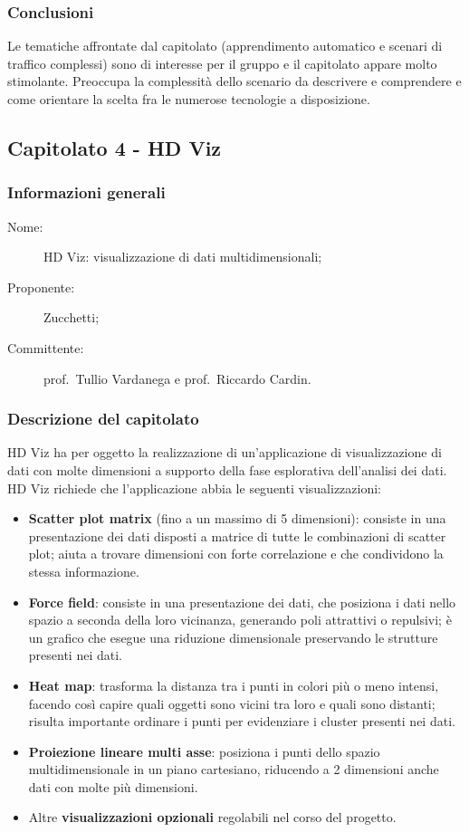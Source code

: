 \subsubsection{Conclusioni}
Le tematiche affrontate dal capitolato (apprendimento automatico e scenari di traffico complessi) sono di interesse per il gruppo e il capitolato appare molto stimolante. Preoccupa la complessità dello scenario da descrivere e comprendere e come orientare la scelta fra le numerose tecnologie a disposizione.

\subsection{Capitolato 4 - HD Viz}
\subsubsection{Informazioni generali}
\begin{description}
	\item[Nome:] HD Viz: visualizzazione di dati multidimensionali;
	\item[Proponente:] Zucchetti;
	\item[Committente:] prof.~Tullio Vardanega e prof.~Riccardo Cardin.
\end{description}
\subsubsection{Descrizione del capitolato}
HD Viz ha per oggetto la realizzazione di un'applicazione di visualizzazione di dati con molte dimensioni a supporto della fase esplorativa dell'analisi dei dati. HD Viz richiede che l'applicazione abbia le seguenti visualizzazioni:
\begin{itemize}
	\item \textbf{Scatter plot matrix} (fino a un massimo di 5 dimensioni): consiste in una presentazione dei dati disposti a matrice di tutte le combinazioni di scatter plot; aiuta a trovare dimensioni con forte correlazione e che condividono la stessa informazione.
	\item \textbf{Force field}: consiste in una presentazione dei dati, che posiziona i dati nello spazio a seconda della loro vicinanza, generando poli attrattivi o repulsivi; è un grafico che esegue una riduzione dimensionale preservando le strutture presenti nei dati.
	\item \textbf{Heat map}: trasforma la distanza tra i punti in colori più o meno intensi, facendo così capire quali oggetti sono vicini tra loro e quali sono distanti; risulta importante ordinare i punti per evidenziare i cluster presenti nei dati.
	\item \textbf{Proiezione lineare multi asse}: posiziona i punti dello spazio multidimensionale in un piano cartesiano, riducendo a 2 dimensioni anche dati con molte più dimensioni.
	\item Altre \textbf{visualizzazioni opzionali} regolabili nel corso del progetto.
\end{itemize}

